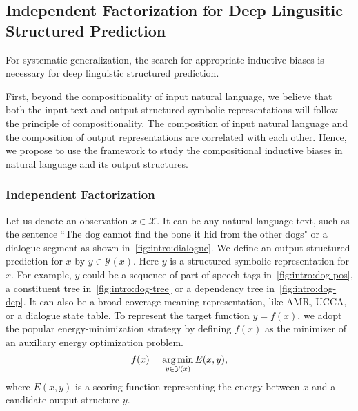 %

\subsection{Independent Factorization for Deep Lingusitic Structured
  Prediction}
\label{ssec:intro:bias-dsp}

For systematic generalization, the search for appropriate inductive
biases is necessary for deep linguistic structured prediction.

First, beyond the compositionality of input natural language, we
believe that both the input text and output structured symbolic
representations will follow the principle of compositionality. The
composition of input natural language and the composition of output
representations are correlated with each other. Hence, we propose to
use the  framework to study the
compositional inductive biases in natural language and its output
structures.

\subsubsection{Independent Factorization}
\label{ssec:intro:ind-factorization}

Let us denote an observation $x \in \mathcal{X}$. It can be any natural
language text, such as the sentence ``The dog cannot find the bone it
hid from the other dogs" or a dialogue segment as shown
in~\autoref{fig:intro:dialogue}. We define an output structured
prediction for $x$ by $y \in \mathcal{Y}(x)$. Here $y$ is a structured
symbolic representation for $x$. For example, $y$ could be a sequence
of part-of-speech tags in~\autoref{fig:intro:dog-pos}, a constituent
tree in~\autoref{fig:intro:dog-tree} or a dependency tree
in~\autoref{fig:intro:dog-dep}. It can also be a broad-coverage
meaning representation, like AMR, UCCA, or a dialogue state table. To
represent the target function $y=f(x)$, we adopt the popular
energy-minimization strategy by defining $f(x)$ as the minimizer of an
auxiliary energy optimization problem.
\begin{equation}
\label{eq:argmin}
f(x) = \operatorname*{arg\,min}_{y \in \mathcal{Y}(x)} E(x, y),
\end{equation}
where $E(x,y)$ is a scoring function representing the energy between
$x$ and a candidate output structure $y$.

